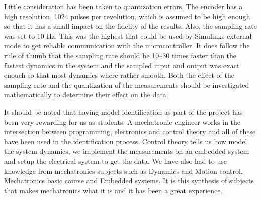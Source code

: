 Little consideration has been taken to quantization errors. The
encoder has a high resolution, 1024 pulses per revolution, which is assumed to
be high enough so that it has a small impact on the fidelity of the results.
Also, the sampling rate was set to 10 Hz. This was the highest that could be
used by Simulinks external mode to get reliable communication with the
microcontroller. It does follow the rule of thumb that the sampling rate should
be 10--30 times faster than the fastest dynamics in the system and the sampled
input and output was exact enouch so that most dynamics where rather smooth.
Both the effect of the sampling rate and the quantization of the measurements
should be investigated mathematically to determine their effect on the data.

It should be noted that having model identification as part of the project has
been very rewarding for us as students. A mechatronic engineer works in the
intersection between programming, electronics and control theory and all of
these have been used in the identification process. Control theory tells us how
model the system dynamics, we implement the measurements on an embedded system
and setup the electrical system to get the data. We have also had to use
knowledge from mechatronics subjects such as Dynamics and Motion control,
Mechatronics basic course and Embedded systems. It is this synthesis of subjects
that makes mechatronics what it is and it has been a great experience. 
